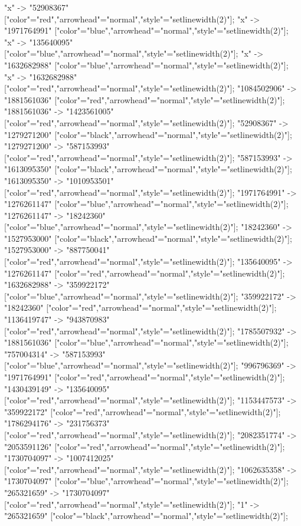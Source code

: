 {    "x" -> "52908367" ["color"="red","arrowhead"="normal","style"="setlinewidth(2)"];
    "x" -> "1971764991" ["color"="blue","arrowhead"="normal","style"="setlinewidth(2)"];
    "x" -> "135640095" ["color"="blue","arrowhead"="normal","style"="setlinewidth(2)"];
    "x" -> "1632682988" ["color"="blue","arrowhead"="normal","style"="setlinewidth(2)"];
    "x" -> "1632682988" ["color"="red","arrowhead"="normal","style"="setlinewidth(2)"];
    "1084502906" -> "1881561036" ["color"="red","arrowhead"="normal","style"="setlinewidth(2)"];
    "1881561036" -> "1423561005" ["color"="red","arrowhead"="normal","style"="setlinewidth(2)"];
    "52908367" -> "1279271200" ["color"="black","arrowhead"="normal","style"="setlinewidth(2)"];
    "1279271200" -> "587153993" ["color"="red","arrowhead"="normal","style"="setlinewidth(2)"];
    "587153993" -> "1613095350" ["color"="black","arrowhead"="normal","style"="setlinewidth(2)"];
    "1613095350" -> "1010953501" ["color"="red","arrowhead"="normal","style"="setlinewidth(2)"];
    "1971764991" -> "1276261147" ["color"="blue","arrowhead"="normal","style"="setlinewidth(2)"];
    "1276261147" -> "18242360" ["color"="blue","arrowhead"="normal","style"="setlinewidth(2)"];
    "18242360" -> "1527953000" ["color"="black","arrowhead"="normal","style"="setlinewidth(2)"];
    "1527953000" -> "887750041" ["color"="red","arrowhead"="normal","style"="setlinewidth(2)"];
    "135640095" -> "1276261147" ["color"="red","arrowhead"="normal","style"="setlinewidth(2)"];
    "1632682988" -> "359922172" ["color"="blue","arrowhead"="normal","style"="setlinewidth(2)"];
    "359922172" -> "18242360" ["color"="red","arrowhead"="normal","style"="setlinewidth(2)"];
    "1136419747" -> "943870983" ["color"="red","arrowhead"="normal","style"="setlinewidth(2)"];
    "1785507932" -> "1881561036" ["color"="blue","arrowhead"="normal","style"="setlinewidth(2)"];
    "757004314" -> "587153993" ["color"="blue","arrowhead"="normal","style"="setlinewidth(2)"];
    "996796369" -> "1971764991" ["color"="red","arrowhead"="normal","style"="setlinewidth(2)"];
    "1430439149" -> "135640095" ["color"="red","arrowhead"="normal","style"="setlinewidth(2)"];
    "1153447573" -> "359922172" ["color"="red","arrowhead"="normal","style"="setlinewidth(2)"];
    "1786294176" -> "231756373" ["color"="red","arrowhead"="normal","style"="setlinewidth(2)"];
    "2082351774" -> "2053591126" ["color"="red","arrowhead"="normal","style"="setlinewidth(2)"];
    "1730704097" -> "1007412025" ["color"="red","arrowhead"="normal","style"="setlinewidth(2)"];
    "1062635358" -> "1730704097" ["color"="blue","arrowhead"="normal","style"="setlinewidth(2)"];
    "265321659" -> "1730704097" ["color"="red","arrowhead"="normal","style"="setlinewidth(2)"];
    "1" -> "265321659" ["color"="black","arrowhead"="normal","style"="setlinewidth(2)"];
}